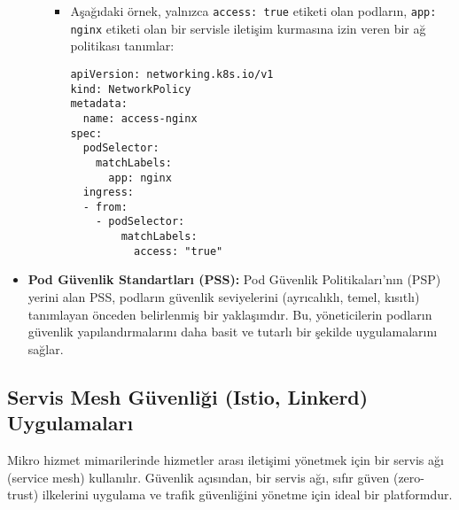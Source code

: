 \begin{itemize}
\begin{itemize}
            \begin{itemize}
                \item Aşağıdaki örnek, yalnızca \texttt{access: true} etiketi olan podların, \texttt{app: nginx} etiketi olan bir servisle iletişim kurmasına izin veren bir ağ politikası tanımlar:
\begin{verbatim}
apiVersion: networking.k8s.io/v1
kind: NetworkPolicy
metadata:
  name: access-nginx
spec:
  podSelector:
    matchLabels:
      app: nginx
  ingress:
  - from:
    - podSelector:
        matchLabels:
          access: "true"
\end{verbatim}
            \end{itemize}
    \end{itemize}
    \item \textbf{Pod Güvenlik Standartları (PSS):} Pod Güvenlik Politikaları'nın (PSP) yerini alan PSS, podların güvenlik seviyelerini (ayrıcalıklı, temel, kısıtlı) tanımlayan önceden belirlenmiş bir yaklaşımdır. Bu, yöneticilerin podların güvenlik yapılandırmalarını daha basit ve tutarlı bir şekilde uygulamalarını sağlar.
\end{itemize}

\subsection{Servis Mesh Güvenliği (Istio, Linkerd) Uygulamaları}

Mikro hizmet mimarilerinde hizmetler arası iletişimi yönetmek için bir servis ağı (service mesh) kullanılır. Güvenlik açısından, bir servis ağı, sıfır güven (zero-trust) ilkelerini uygulama ve trafik güvenliğini yönetme için ideal bir platformdur.

